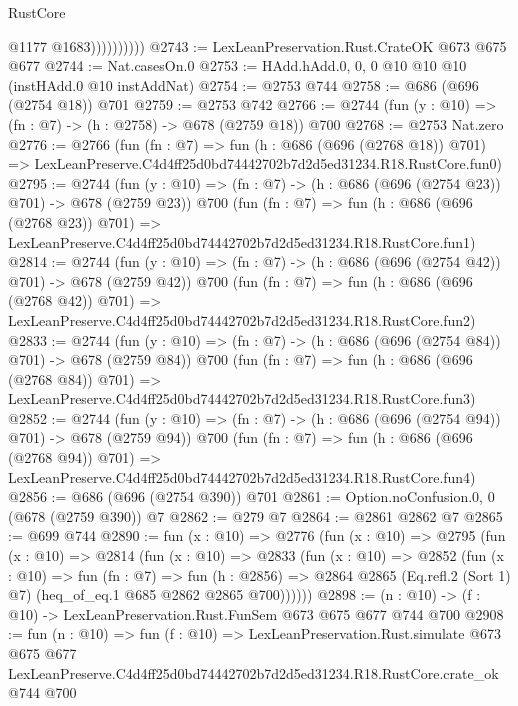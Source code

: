 \begin{lexlean}{RustCore}
\begin{coremodule}
                        @1177
                        @1683))))))))))
@2743 := LexLeanPreservation.Rust.CrateOK @673 @675 @677
@2744 := Nat.casesOn.{0}
@2753 := HAdd.hAdd.{0, 0, 0} @10 @10 @10 (instHAdd.{0} @10 instAddNat)
@2754 := @2753 @744
@2758 := @686 (@696 (@2754 @18)) @701
@2759 := @2753 @742
@2766 := @2744 (fun (y : @10) => (fn : @7) -> (h : @2758) -> @678 (@2759 @18)) @700
@2768 := @2753 Nat.zero
@2776 := @2766
    (fun (fn : @7) =>
    fun (h : @686 (@696 (@2768 @18)) @701) =>
    LexLeanPreserve.C4d4ff25d0bd74442702b7d2d5ed31234.R18.RustCore.fun0)
@2795 := @2744
    (fun (y : @10) => (fn : @7) -> (h : @686 (@696 (@2754 @23)) @701) -> @678 (@2759 @23))
    @700
    (fun (fn : @7) =>
    fun (h : @686 (@696 (@2768 @23)) @701) =>
    LexLeanPreserve.C4d4ff25d0bd74442702b7d2d5ed31234.R18.RustCore.fun1)
@2814 := @2744
    (fun (y : @10) => (fn : @7) -> (h : @686 (@696 (@2754 @42)) @701) -> @678 (@2759 @42))
    @700
    (fun (fn : @7) =>
    fun (h : @686 (@696 (@2768 @42)) @701) =>
    LexLeanPreserve.C4d4ff25d0bd74442702b7d2d5ed31234.R18.RustCore.fun2)
@2833 := @2744
    (fun (y : @10) => (fn : @7) -> (h : @686 (@696 (@2754 @84)) @701) -> @678 (@2759 @84))
    @700
    (fun (fn : @7) =>
    fun (h : @686 (@696 (@2768 @84)) @701) =>
    LexLeanPreserve.C4d4ff25d0bd74442702b7d2d5ed31234.R18.RustCore.fun3)
@2852 := @2744
    (fun (y : @10) => (fn : @7) -> (h : @686 (@696 (@2754 @94)) @701) -> @678 (@2759 @94))
    @700
    (fun (fn : @7) =>
    fun (h : @686 (@696 (@2768 @94)) @701) =>
    LexLeanPreserve.C4d4ff25d0bd74442702b7d2d5ed31234.R18.RustCore.fun4)
@2856 := @686 (@696 (@2754 @390)) @701
@2861 := Option.noConfusion.{0, 0} (@678 (@2759 @390)) @7
@2862 := @279 @7
@2864 := @2861 @2862 @7
@2865 := @699 @744
@2890 := fun (x : @10) =>
  @2776
    (fun (x : @10) =>
    @2795
      (fun (x : @10) =>
      @2814
        (fun (x : @10) =>
        @2833
          (fun (x : @10) =>
          @2852
            (fun (x : @10) =>
            fun (fn : @7) =>
            fun (h : @2856) =>
            @2864 @2865 (Eq.refl.{2} (Sort 1) @7) (heq_of_eq.{1} @685 @2862 @2865 @700))))))
@2898 := (n : @10) -> (f : @10) -> LexLeanPreservation.Rust.FunSem @673 @675 @677 @744 @700
@2908 := fun (n : @10) =>
  fun (f : @10) =>
  LexLeanPreservation.Rust.simulate
    @673
    @675
    @677
    LexLeanPreserve.C4d4ff25d0bd74442702b7d2d5ed31234.R18.RustCore.crate_ok
    @744
    @700
\end{coremodule}
\end{lexlean}
